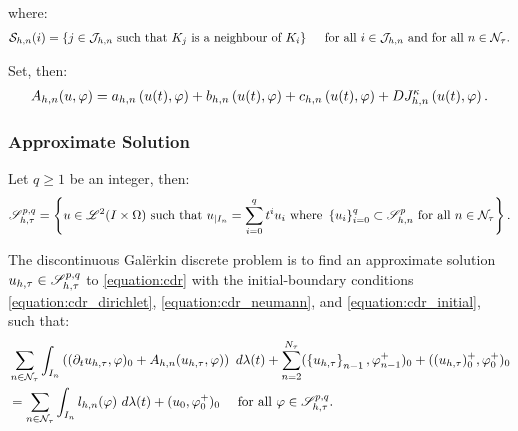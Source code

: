 where:
\begin{gather} %
    \NeighboursTime{i} = \left\{ j \in \SpaceTimeIndices \text{ such that } K_j \text{ is a neighbour of } K_i \right\} \quad \text{ for all } i \in \SpaceTimeIndices \text{ and for all } n \in \TimeIndices.
\end{gather}

Set, then:
\begin{gather}
    A_{h, n}(u, \varphi) = a_{h, n} \left( u(t), \varphi \right) + b_{h, n} \left( u(t), \varphi \right) + c_{h, n} \left( u(t), \varphi \right) + D J^{\kappa}_{h, n} \left( u(t), \varphi \right) \label{equation:cdr_Ahn}.
\end{gather}

\newpage
\subsubsection{Approximate Solution}

\begin{definition}
    Let $q \geq 1$ be an integer, then:
    \begin{gather} %
        \SpaceSolution_{h, \tau}^{p, q} = \left\{ u \in \SpaceLp{2}(I \times \Omega) \text{ such that } u_{\mid I_n} = \sum_{i = 0}^q t^i u_i \text{ where } \left\{ u_i \right\}_{i = 0}^q \subset \SpaceSolution_{h, n}^p \text{ for all } n \in \TimeIndices \right\}.
    \end{gather}
\end{definition}

The discontinuous Galërkin discrete problem is to find an approximate solution $u_{h, \tau} \in \mathscr{S}_{h, \tau}^{p, q}$ to \eqref{equation:cdr} with the initial-boundary conditions \eqref{equation:cdr_dirichlet}, \eqref{equation:cdr_neumann}, and \eqref{equation:cdr_initial}, such that:
\begin{align} %
    &\sum_{n \in \TimeIndices} \int_{I_n} \left( (\partial_t u_{h, \tau}, \varphi )_0 + A_{h, n}(u_{h, \tau}, \varphi) \right) ~ d \lambda(t) \notag + \sum_{n = 2}^{\nTimeIndices} (\left\{ u_{h, \tau} \right\}_{n - 1}, \varphi_{n - 1}^+ )_0 + ((u_{h, \tau})_0^+, \varphi_0^+ )_0 \notag \\
    &= \sum_{n \in \TimeIndices} \int_{I_n} l_{h, n}(\varphi) ~ d \lambda(t) + (u_0, \varphi_0^+ )_0 \quad \text{ for all } \varphi \in \SpaceSolution_{h, \tau}^{p, q}. \label{equation:cdr_discrete}
\end{align}

